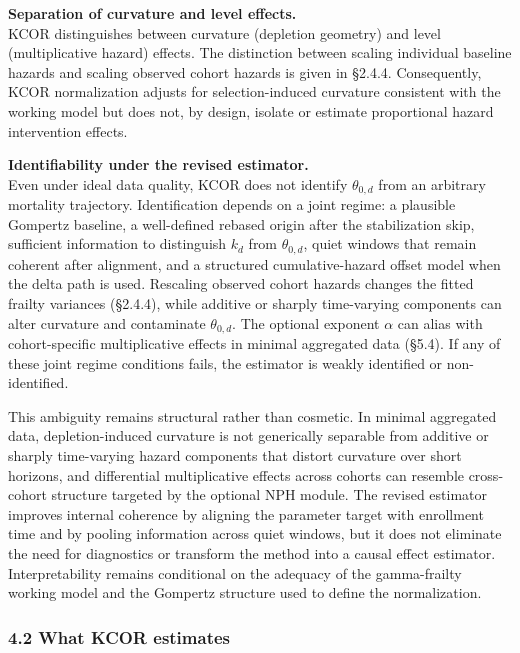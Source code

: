 \documentclass[
]{article}
\begin{document}
\textbf{Separation of curvature and level effects.}\\
KCOR distinguishes between curvature (depletion geometry) and level (multiplicative hazard) effects. The distinction between scaling individual baseline hazards and scaling observed cohort hazards is given in §2.4.4. Consequently, KCOR normalization adjusts for selection-induced curvature consistent with the working model but does not, by design, isolate or estimate proportional hazard intervention effects.

\textbf{Identifiability under the revised estimator.}\\
Even under ideal data quality, KCOR does not identify \(\theta_{0,d}\) from an arbitrary mortality trajectory. Identification depends on a joint regime: a plausible Gompertz baseline, a well-defined rebased origin after the stabilization skip, sufficient information to distinguish \(k_d\) from \(\theta_{0,d}\), quiet windows that remain coherent after alignment, and a structured cumulative-hazard offset model when the delta path is used. Rescaling observed cohort hazards changes the fitted frailty variances (§2.4.4), while additive or sharply time-varying components can alter curvature and contaminate \(\theta_{0,d}\). The optional exponent \(\alpha\) can alias with cohort-specific multiplicative effects in minimal aggregated data (§5.4). If any of these joint regime conditions fails, the estimator is weakly identified or non-identified.

This ambiguity remains structural rather than cosmetic. In minimal aggregated data, depletion-induced curvature is not generically separable from additive or sharply time-varying hazard components that distort curvature over short horizons, and differential multiplicative effects across cohorts can resemble cross-cohort structure targeted by the optional NPH module. The revised estimator improves internal coherence by aligning the parameter target with enrollment time and by pooling information across quiet windows, but it does not eliminate the need for diagnostics or transform the method into a causal effect estimator. Interpretability remains conditional on the adequacy of the gamma-frailty working model and the Gompertz structure used to define the normalization.

\subsubsection{4.2 What KCOR estimates}\label{what-kcor-estimates}
\end{document}
